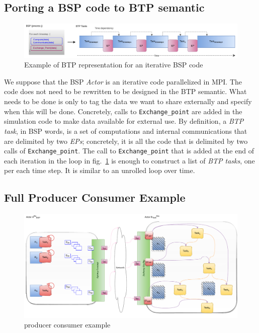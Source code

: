 \subsection{Porting a BSP code to BTP semantic}\label{sec:btp:porting}

\begin{figure}[tb]
\centerline{\includegraphics[width=\textwidth]{figures/unrolled.pdf}}
\caption{Example of BTP representation for an iterative BSP code}
\label{figunroll}
\end{figure}

We suppose that the BSP \textit{Actor} is an iterative code parallelized in MPI. The code does not need to be rewritten to be designed in the BTP semantic. What needs to be done is only to tag the data we want to share externally and specify when this will be done. Concretely, calls to \texttt{Exchange\_point} are added in the simulation code to make data available for external use. By definition, a \textit{BTP task}, in BSP words, is a set of computations and internal communications that are delimited by two \textit{EPs}; concretely, it is all the code that is delimited by two calls of \texttt{Exchange\_point}. The call to \texttt{Exchange\_point} that is added at the end of each iteration in the loop in fig.~\ref{figunroll} is enough to construct a list of \textit{BTP tasks}, one per each time step. It is similar to an unrolled loop over time.


\subsection{Full Producer Consumer Example}\label{sec:btp:FullPCExample}

 
\begin{figure}[tb]\centering
\includegraphics[width=\columnwidth]{figures/BTP.pdf}
\caption{producer consumer example}
\label{figBTP}
\end{figure}

